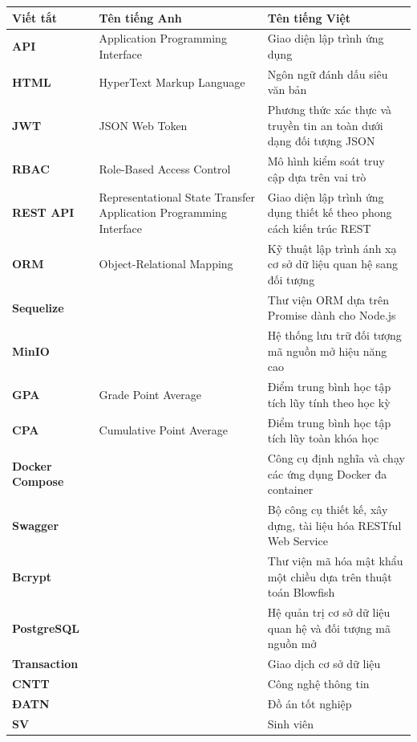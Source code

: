 \documentclass[../DoAn.tex]{subfiles}
\begin{document}
\begin{longtable}{l p{6cm} p{7cm}}
	\hline
   \textbf{Viết tắt}  & \textbf{Tên tiếng Anh}	& \textbf{Tên tiếng Việt} \\ \hline 
	\textbf{API} & Application Programming Interface & Giao diện lập trình ứng dụng\\
	\textbf{HTML} & HyperText Markup Language & Ngôn ngữ đánh dấu siêu văn bản\\
	\textbf{JWT} & JSON Web Token & Phương thức xác thực và truyền tin an toàn dưới dạng đối tượng JSON\\
	\textbf{RBAC} & Role-Based Access Control & Mô hình kiểm soát truy cập dựa trên vai trò\\
	\textbf{REST API} & Representational State Transfer Application Programming Interface & Giao diện lập trình ứng dụng thiết kế theo phong cách kiến trúc REST\\
	\textbf{ORM} & Object-Relational Mapping & Kỹ thuật lập trình ánh xạ cơ sở dữ liệu quan hệ sang đối tượng\\
	\textbf{Sequelize} & & Thư viện ORM dựa trên Promise dành cho Node.js\\
	\textbf{MinIO} & & Hệ thống lưu trữ đối tượng mã nguồn mở hiệu năng cao\\
	\textbf{GPA} & Grade Point Average & Điểm trung bình học tập tích lũy tính theo học kỳ\\
	\textbf{CPA} & Cumulative Point Average & Điểm trung bình học tập tích lũy toàn khóa học\\
	\textbf{Docker Compose} & & Công cụ định nghĩa và chạy các ứng dụng Docker đa container\\
	\textbf{Swagger} & & Bộ công cụ thiết kế, xây dựng, tài liệu hóa RESTful Web Service\\
	\textbf{Bcrypt} & & Thư viện mã hóa mật khẩu một chiều dựa trên thuật toán Blowfish\\
	\textbf{PostgreSQL} & & Hệ quản trị cơ sở dữ liệu quan hệ và đối tượng mã nguồn mở\\
	\textbf{Transaction} & & Giao dịch cơ sở dữ liệu\\
	\textbf{CNTT} & & Công nghệ thông tin\\
	\textbf{ĐATN} & & Đồ án tốt nghiệp \\
	\textbf{SV} & & Sinh viên \\

    \hline
\end{longtable}
\end{document}
